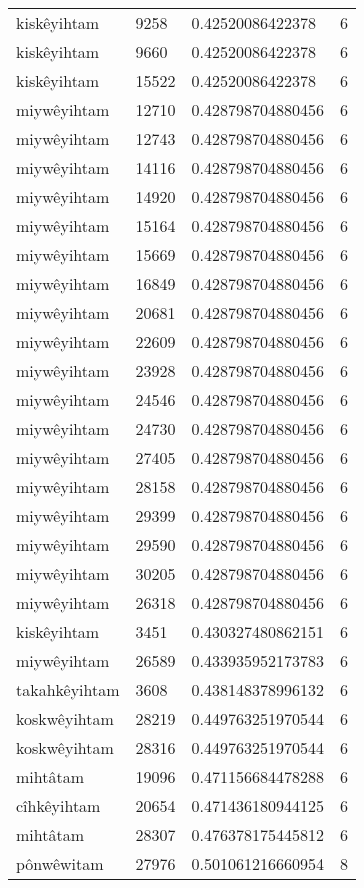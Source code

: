 \begin{longtable}{llll}
kiskêyihtam & 9258 & 0.42520086422378 & 6 \\
kiskêyihtam & 9660 & 0.42520086422378 & 6 \\
kiskêyihtam & 15522 & 0.42520086422378 & 6 \\
miywêyihtam & 12710 & 0.428798704880456 & 6 \\
miywêyihtam & 12743 & 0.428798704880456 & 6 \\
miywêyihtam & 14116 & 0.428798704880456 & 6 \\
miywêyihtam & 14920 & 0.428798704880456 & 6 \\
miywêyihtam & 15164 & 0.428798704880456 & 6 \\
miywêyihtam & 15669 & 0.428798704880456 & 6 \\
miywêyihtam & 16849 & 0.428798704880456 & 6 \\
miywêyihtam & 20681 & 0.428798704880456 & 6 \\
miywêyihtam & 22609 & 0.428798704880456 & 6 \\
miywêyihtam & 23928 & 0.428798704880456 & 6 \\
miywêyihtam & 24546 & 0.428798704880456 & 6 \\
miywêyihtam & 24730 & 0.428798704880456 & 6 \\
miywêyihtam & 27405 & 0.428798704880456 & 6 \\
miywêyihtam & 28158 & 0.428798704880456 & 6 \\
miywêyihtam & 29399 & 0.428798704880456 & 6 \\
miywêyihtam & 29590 & 0.428798704880456 & 6 \\
miywêyihtam & 30205 & 0.428798704880456 & 6 \\
miywêyihtam & 26318 & 0.428798704880456 & 6 \\
kiskêyihtam & 3451 & 0.430327480862151 & 6 \\
miywêyihtam & 26589 & 0.433935952173783 & 6 \\
takahkêyihtam & 3608 & 0.438148378996132 & 6 \\
koskwêyihtam & 28219 & 0.449763251970544 & 6 \\
koskwêyihtam & 28316 & 0.449763251970544 & 6 \\
mihtâtam & 19096 & 0.471156684478288 & 6 \\
cîhkêyihtam & 20654 & 0.471436180944125 & 6 \\
mihtâtam & 28307 & 0.476378175445812 & 6 \\
pônwêwitam & 27976 & 0.501061216660954 & 8 \\

\end{longtable}
